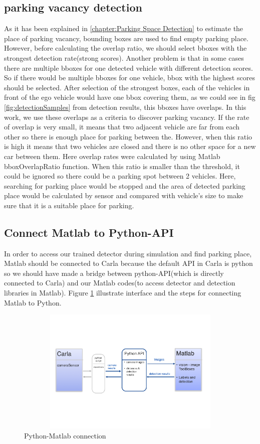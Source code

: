 \subsection{parking vacancy detection}
As it has been explained in \ref{chapter:Parking Space Detection} to estimate the place of parking vacancy, bounding boxes are used to find empty parking place. However, before calculating the overlap ratio, we should select bboxes with the strongest detection rate(strong scores). Another problem is that in some cases there are multiple bboxes for one detected vehicle with different detection scores. So if there would be multiple bboxes for one vehicle, \acrshort{bbox} with the highest scores should be selected. After selection of the strongest boxes, each of the vehicles in front of the ego vehicle would have one bbox covering them, as we could see in fig \ref{fig:detectionSamples} from detection results, this bboxes have overlaps. In this work, we use these overlaps as a criteria to discover parking vacancy. If the rate of overlap is very small, it means that two adjacent vehicle are far from each other so there is enough place for parking between the. However, when this ratio is high it means that two vehicles are closed and there is no other space for a new car between them. Here overlap rates were calculated by using Matlab bboxOverlapRatio function. When this ratio is smaller than the threshold, it could be ignored so there could be a parking spot between 2 vehicles. Here, searching for parking place would be stopped and the area of detected parking place would be calculated by sensor and compared with vehicle's size to make sure that it is a suitable place for parking. 
\subsection{Connect Matlab to Python-API}
In order to access our trained detector during simulation and find parking place, Matlab should be connected to Carla because the default API in Carla is python so we should have made a bridge between python-API(which is directly connected to Carla) and our Matlab codes(to access detector and detection libraries in Matlab). Figure \ref{fig:python-matlab} illustrate interface and the steps for connecting Matlab to Python.
\begin{figure}
    \centering
    \includegraphics[width=12cm, height=6cm]{images/carla-matlab.pdf}
    \caption{Python-Matlab connection}
    \label{fig:python-matlab}
\end{figure}



